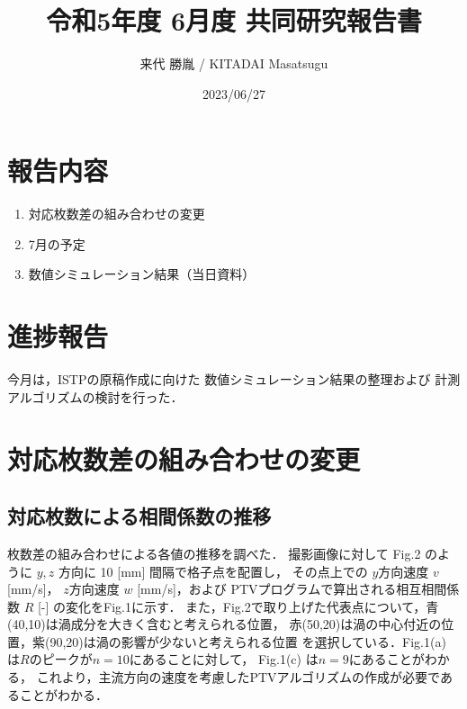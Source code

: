\documentclass[twocolumn,a4j]{jsarticle}
\author{来代 勝胤 / KITADAI Masatsugu}
\title{令和5年度 6月度 共同研究報告書}
\date{2023/06/27}
\begin{document}
\columnseprule=0.1mm
\maketitle

\section*{報告内容}
\begin{enumerate}[1.]
  \item 対応枚数差の組み合わせの変更
  \item 7月の予定
  \item 数値シミュレーション結果（当日資料）
\end{enumerate}

\section*{進捗報告}
今月は，ISTPの原稿作成に向けた
数値シミュレーション結果の整理および
計測アルゴリズムの検討を行った．

\section{対応枚数差の組み合わせの変更}
\subsection{対応枚数による相間係数の推移}
枚数差の組み合わせによる各値の推移を調べた．
撮影画像に対して Fig.2 のように $y,z$ 方向に 10 [mm] 間隔で格子点を配置し，
その点上での $y$方向速度 $v$ [mm/s]， $z$方向速度 $w$ [mm/s]，および
PTVプログラムで算出される相互相間係数 $R$ [-] の変化をFig.1に示す．
また，Fig.2で取り上げた代表点について，青(40,10)は渦成分を大きく含むと考えられる位置，
赤(50,20)は渦の中心付近の位置，紫(90,20)は渦の影響が少ないと考えられる位置
を選択している．Fig.1(a) は$R$のピークが$n=10$にあることに対して，
Fig.1(c) は$n=9$にあることがわかる，
これより，主流方向の速度を考慮したPTVアルゴリズムの作成が必要であることがわかる．\\
\end{document}
